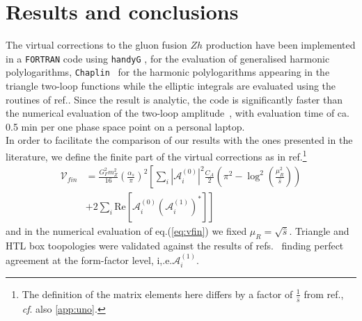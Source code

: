 \section{Results and conclusions} \label{sec:hzres}
The virtual corrections to the gluon fusion $Zh$ production have been implemented in a  \texttt{FORTRAN} code using  \texttt{handyG} \cite{Naterop:2019xaf}, for the evaluation of generalised harmonic polylogarithms, \texttt{Chaplin}~\cite{Buehler:2011ev} for the harmonic polylogarithms appearing in the triangle two-loop functions  while 
the elliptic integrals are evaluated using the routines of
ref.\cite{Bonciani:2018uvv}. Since the result is analytic, the code is significantly faster than the numerical evaluation of the two-loop amplitude~\cite{Chen:2020gae}, with evaluation time of ca. 0.5 min per one phase space point on a personal laptop.\\
In order to facilitate the comparison of our results with the ones
presented in the literature, we define the finite part of the virtual corrections
as in
ref.\cite{Davies:2020drs}\footnote{The definition of the matrix elements here
	differs by a factor of
	$\frac{1}{\hat{s}}$ from ref.\cite{Davies:2020drs}, \textit{cf}. also
	 \autoref{app:uno}.}
\begin{equation}
	\begin{split}
		\mathcal{V}_{fin}&=\frac{G_F^2 m_Z^2}{16}\left(\frac{\alpha_s}{\pi}\right)^2
		\left[ \sum_{i} \left|\mathcal{A}_i^{(0)} \right|^2\frac{C_A}{2}\left(\pi^2-
		\log^2\left(\frac{\mu_R^2}{\hat{s}}\right)\right)\right. \\
		& \left. +2\sum_i\text{Re}\left[\mathcal{A}_i^{(0)}\left(\mathcal{A}_i^{(1)}\right)^*\right]\right]\,
		\label{eq:vfin}
	\end{split}
\end{equation}
and in the numerical evaluation of eq.(\ref{eq:vfin}) we fixed
$\mu_R= \sqrt{\hat{s}}$.
Triangle and HTL box toopologies were validated against the results of refs.~\cite{Hasselhuhn:2016rqt,Davies:2020drs} finding perfect
agreement at the form-factor level, i,.e.$\mathcal{A}_i^{(1)}$. 

